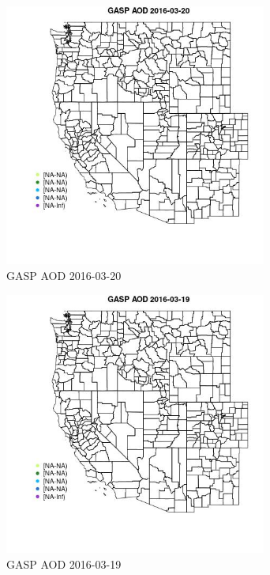 \begin{figure} 
\centering  
\includegraphics[width=0.77\textwidth]{Code_Outputs/Report_ML_input_PM25_Step4_part_e_de_duplicated_aveswNAs_MapObsGASP_AOD2016-03-20.jpg} 
\caption{\label{fig:Report_ML_input_PM25_Step4_part_e_de_duplicated_aveswNAsMapObsGASP_AOD2016-03-20}GASP AOD 2016-03-20} 
\end{figure} 
 

\begin{figure} 
\centering  
\includegraphics[width=0.77\textwidth]{Code_Outputs/Report_ML_input_PM25_Step4_part_e_de_duplicated_aveswNAs_MapObsGASP_AOD2016-03-19.jpg} 
\caption{\label{fig:Report_ML_input_PM25_Step4_part_e_de_duplicated_aveswNAsMapObsGASP_AOD2016-03-19}GASP AOD 2016-03-19} 
\end{figure} 
 

